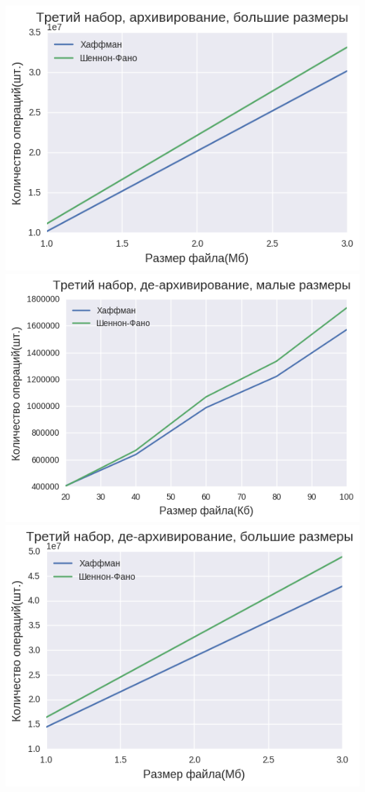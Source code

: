 \documentclass[russian, a4paper, 12pt]{article}
\begin{document}
\begin{center}
\includegraphics[width=0.9\linewidth]{./plots/2/2_3_1_2.png}\\
\includegraphics[width=0.9\linewidth]{./plots/2/2_3_2_1.png}\\
\includegraphics[width=0.9\linewidth]{./plots/2/2_3_2_2.png}\\
\end{center}
\end{document}
